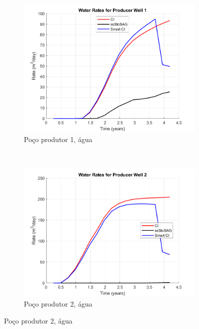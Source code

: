 \begin{figure}[!ht]
	\centering
	\begin{subfigure}[b]{.45\textwidth}
		\includegraphics[width=\textwidth]{figs/resultadosEgg/imgsim3/EGG_WaterWell1_Zoom}
		\caption{Po\c{c}o produtor 1, \'{a}gua}
		\label{EGG3_WaterWell1}
	\end{subfigure}
	~
	\begin{subfigure}[b]{.45\textwidth}
		\includegraphics[width=\textwidth]{figs/resultadosEgg/imgsim3/EGG_WaterWell2_Zoom}
		\caption{Po\c{c}o produtor 2, \'{a}gua}
		\label{EGG3_WaterWell2}
	\end{subfigure}
	

\end{figure}
